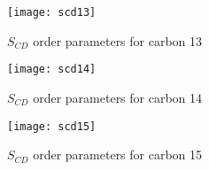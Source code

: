 \documentclass[doublespacing]{elsart}
\begin{document}
\begin{figure}[p]
\begin{center}
\texttt{[image: scd13]}
\end{center}
\caption{$S_{CD}$ order parameters for carbon 13}
\label{fig:scd13}
\end{figure}

\begin{figure}[p]
\begin{center}
\texttt{[image: scd14]}
\end{center}
\caption{$S_{CD}$ order parameters for carbon 14}
\label{fig:scd14}
\end{figure}

\begin{figure}[p]
\begin{center}
\texttt{[image: scd15]}
\end{center}
\caption{$S_{CD}$ order parameters for carbon 15}
\label{fig:scd15}
\end{figure}









\end{document}
